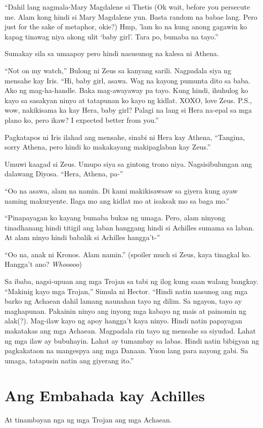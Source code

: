 \documentclass[12pt,letterpaper]{report}
\begin{document}
``Dahil lang nagmala-Mary Magdalene si Thetis (Ok wait, before you persecute me. Alam kong hindi si Mary Magdalene yun. Basta random na babae lang. Pero just for the sake of metaphor, okie?) Hmp, 'lam ko na kung anong gagawin ko kapag tinawag niya akong ulit `baby girl'. Tara po, bumaba na tayo.''

Sumakay sila sa umaapoy pero hindi nasusunog na kalesa ni Athena.

``Not on my watch,'' Bulong ni Zeus sa kanyang sarili. Nagpadala siya ng mensahe kay Iris. ``Hi, baby girl, asawa. Wag na kayong pumunta dito sa baba. Ako ng mag-ha-handle. Baka mag-awayaway pa tayo. Kung hindi, ihuhulog ko kayo sa sasakyan ninyo at tatapunan ko kayo ng kidlat. XOXO, love Zeus. P.S., wow, nakikisama ka kay Hera, baby girl? Palagi na lang si Hera na-epal sa mga plano ko, pero ikaw? I expected better from you.''

Pagkatapos ni Iris ilahad ang mensahe, sinabi ni Hera kay Athena, ``Tangina, sorry Athena, pero hindi ko makakayang makipaglaban kay Zeus.''

Umuwi kaagad si Zeus. Umupo siya sa gintong trono niya. Nagsisibulungan ang dalawang Diyosa. ``Hera, Athena, pa-''

``Oo na asawa, alam na namin. Di kami makikisawsaw sa giyera kung ayaw naming makuryente. Ilaga mo ang kidlat mo at isaksak mo sa baga mo.''

``Pinapayagan ko kayang bumaba bukas ng umaga. Pero, alam ninyong tinadhanang hindi titigil ang laban hanggang hindi si Achilles sumama sa laban. At alam ninyo hindi babalik si Achilles hangga't-''


``Oo na, anak ni Kronos. Alam namin.'' (spoiler much si Zeus, kaya tinagkal ko. Hangga't ano? \textit{Whooooo})

Sa ibaba, nagsi-upuan ang mga Trojan sa tabi ng ilog kung saan walang bangkay. ``Makinig kayo mga Trojan,'' Simula ni Hector. ``Hindi natin nasunog ang mga barko ng Achaean dahil lamang naunahan tayo ng dilim. Sa ngayon, tayo ay maghapunan. Pakainin ninyo ang inyong mga kabayo ng mais at painomin ng alak(?). Mag-ilaw kayo ng apoy hangga't kaya ninyo. Hindi natin papayagan makatakas ang mga Achaean. Magpadala rin tayo ng mensahe sa siyudad. Lahat ng mga ilaw ay bubuhayin. Lahat ay tumambay sa labas. Hindi natin bibigyan ng pagkakataon na mangespya ang mga Danaan. Yuon lang para nayong gabi. Sa umaga, tatapusin natin ang giyerang ito.''
\pagebreak
\chapter{Ang Embahada kay Achilles}
At tinambayan nga ng mga Trojan ang mga Achaean.
\end{document}
